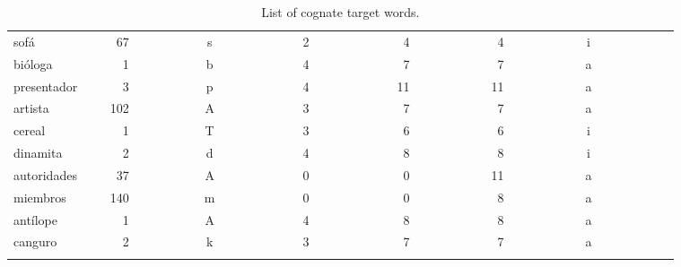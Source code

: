 \begin{longtable}{|l|c|c|c|c|c|c|}
sof\'{a}~~~~~~~~~&~67~~~~~~~~~~&s~~~~~~~~~~~~&2~~~~~~~~~~~~&~4~~~~~~~~~~~&~4~~~~~~~~~~~&i~~~~~~~~~~~~\\ 
bi\'{o}loga~~~~~~&~~1~~~~~~~~~~&b~~~~~~~~~~~~&4~~~~~~~~~~~~&~7~~~~~~~~~~~&~7~~~~~~~~~~~&a~~~~~~~~~~~~\\ 
presentador~~&~~3~~~~~~~~~~&p~~~~~~~~~~~~&4~~~~~~~~~~~~&11~~~~~~~~~~~&11~~~~~~~~~~~&a~~~~~~~~~~~~\\ 
artista~~~~~~&102~~~~~~~~~~&A~~~~~~~~~~~~&3~~~~~~~~~~~~&~7~~~~~~~~~~~&~7~~~~~~~~~~~&a~~~~~~~~~~~~\\ 
cereal~~~~~~~&~~1~~~~~~~~~~&T~~~~~~~~~~~~&3~~~~~~~~~~~~&~6~~~~~~~~~~~&~6~~~~~~~~~~~&i~~~~~~~~~~~~\\ 
dinamita~~~~~&~~2~~~~~~~~~~&d~~~~~~~~~~~~&4~~~~~~~~~~~~&~8~~~~~~~~~~~&~8~~~~~~~~~~~&i~~~~~~~~~~~~\\ 
autoridades~~&~37~~~~~~~~~~&A~~~~~~~~~~~~&0~~~~~~~~~~~~&~0~~~~~~~~~~~&11~~~~~~~~~~~&a~~~~~~~~~~~~\\ 
miembros~~~~~&140~~~~~~~~~~&m~~~~~~~~~~~~&0~~~~~~~~~~~~&~0~~~~~~~~~~~&~8~~~~~~~~~~~&a~~~~~~~~~~~~\\ 
ant\'{i}lope~~~~~&~~1~~~~~~~~~~&A~~~~~~~~~~~~&4~~~~~~~~~~~~&~8~~~~~~~~~~~&~8~~~~~~~~~~~&a~~~~~~~~~~~~\\ 
canguro~~~~~~&~~2~~~~~~~~~~&k~~~~~~~~~~~~&3~~~~~~~~~~~~&~7~~~~~~~~~~~&~7~~~~~~~~~~~&a~~~~~~~~~~~~\\ 
\hline
\caption{List of cognate target words.}\label{span_cognates}
\end{longtable}
